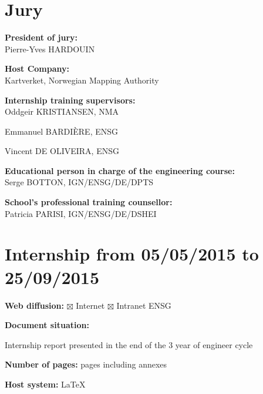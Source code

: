 \newevenpage
\thispagestyle{plain}
\section*{Jury}
\shorthandoff{:}

\vspace{0.5cm}

\textbf{President of jury:} \\

Pierre-Yves HARDOUIN

\vspace{0.5cm}

\textbf{Host Company:} \\

Kartverket, Norwegian Mapping Authority

\vspace{0.5cm}

\textbf{Internship training supervisors:} \\ 

Oddgeir KRISTIANSEN, NMA \par
Emmanuel BARDIÈRE, ENSG \par
Vincent DE OLIVEIRA, ENSG

\vspace{0.5cm}

\textbf{Educational person in charge of the engineering course:} \\

Serge BOTTON, IGN/ENSG/DE/DPTS

\vspace{0.5cm}

\textbf{School's professional training counsellor:} \\

Patricia PARISI, IGN/ENSG/DE/DSHEI

\vspace{1cm}


\section*{Internship from 05/05/2015 to 25/09/2015}
\vspace{0.3cm}
\textbf{Web diffusion:} $\boxtimes$ Internet \hspace{0.2cm} $\boxtimes$ Intranet ENSG

\vspace{0.3cm}
\textbf{Document situation:} 

\vspace{0.2cm}
\par
Internship report presented in the end of the 3 year of engineer cycle

\vspace{0.3cm}
\textbf{Number of pages:}  pages including  annexes

\vspace{0.3cm}
\textbf{Host system:} \LaTeX
\vspace{1cm}
